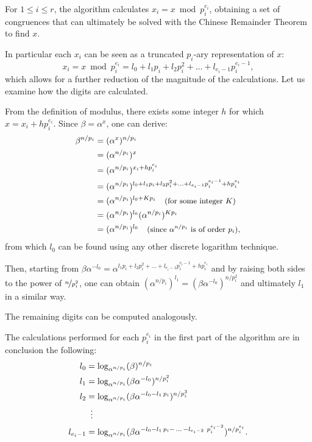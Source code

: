 \documentclass[UTF8]{article}
\begin{document}
For $1 \leq i \leq r$, the algorithm calculates $x_i = x \bmod{p_i^{e_i}}$, obtaining a set of congruences that can ultimately be solved with the Chinese Remainder Theorem to find $x$.

In particular each $x_i$ can be seen as a truncated $p_i$-ary representation of $x$:
$$x_i = x \bmod{p_i^{e_i}} = l_0 + l_1 p_i + l_2 p_i^2 + \ldots + l_{e_i - 1} p_i^{e_i - 1},$$
which allows for a further reduction of the magnitude of the calculations. Let us examine how the digits are calculated.

From the definition of modulus, there exists some integer $h$ for which $x=x_i+hp_i^{e_i}$. Since \mbox{$\beta=\alpha^x$}, one can derive:
\begin{align*}
    \beta^{n/p_i} & = (\alpha^x)^{n/p_i}                \\
                  & = (\alpha^{n/p_i})^x                \\
                  & = (\alpha^{n/p_i})^{x_i+hp_i^{e_i}} \\
                  & = (\alpha^{n/p_i})^{l_0 + l_1 p_i + l_2 p_i^2 + \ldots + l_{e_i - 1} p_i^{e_i - 1}+hp_i^{e_i}} \\
                  & = (\alpha^{n/p_i})^{l_0 + K p_i} \quad \text{\small{(for some integer $K$)}}  \\
                  & = (\alpha^{n/p_i})^{l_0} (\alpha^{n/p_i})^{K p_i} \\
                  & = (\alpha^{n/p_i})^{l_0} \quad \text{\small{(since $\alpha^{n/p_i}$ is of order $p_i$)}},
\end{align*}
from which $l_0$ can be found using any other discrete logarithm technique.

Then, starting from $\beta\alpha^{-l_0} = \alpha^{l_1 p_i + l_2 p_i^2 + \ldots + l_{e_i - 1} p_i^{e_i - 1}+hp_i^{e_i}}$ and by raising both sides to the power of $\nicefrac{n}{p_i^2}$, one can obtain $(\alpha^{n/p_i})^{l_1}=(\beta\alpha^{-l_0})^{n/p_i^2}$ and ultimately $l_1$ in a similar way.

The remaining digits can be computed analogously.

The calculations performed for each $p_i^{e_i}$ in the first part of the algorithm are in conclusion the following:
\begin{align*}
    l_0         &              = \log_{\alpha^{n / p_i}}(\beta)^{n / p_i}                              \\
    l_1         &              = \log_{\alpha^{n / p_i}}(\beta\alpha^{-l_0})^{n / p_i^2}               \\
    l_2         &              = \log_{\alpha^{n / p_i}}(\beta\alpha^{-l_0 - l_1 \, p_i})^{n / p_i^3}  \\
                & \vdotswithin{=}                                                                      \\
    l_{e_i - 1} &              = \log_{\alpha^{n / p_i}}(\beta\alpha^{-l_0 - l_1 \, p_i - \, \ldots \, - l_{e_i - 2} \ p_i^{e_i - 2}})^{n / p_i^{e_i}}.
\end{align*}
\end{document}
